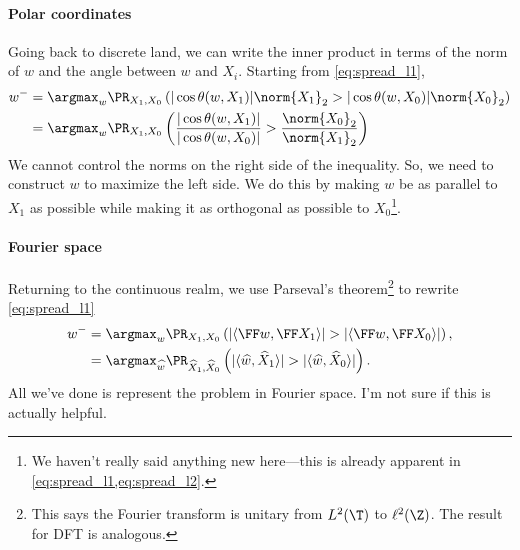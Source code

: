 \documentclass{article}
\begin{document}
\paragraph*{Polar coordinates}
Going back to discrete land, we can write the inner product in terms of the norm of $w$ and the angle between $w$ and $X_i$.
Starting from \cref{eq:spread_l1},
\begin{align}
  w^-
  &= \argmax_{w} \PR_{X_1, X_0} \left( |\cos \theta(w,X_1) | \norm{X_1}_{2} > | \cos \theta(w,X_0) | \norm{X_0}_{2} \right) \\
  &= \argmax_{w} \PR_{X_1, X_0} \left( \frac{ |\cos \theta(w,X_1) | }{ | \cos \theta(w,X_0) | } > \frac{ \norm{X_0}_{2} }{ \norm{X_1}_{2} } \right)
\end{align}
We cannot control the norms on the right side of the inequality.
So, we need to construct $w$ to maximize the left side.
We do this by making $w$ be as parallel to $X_1$ as possible while making it as orthogonal as possible to $X_0$\footnote{We haven't really said anything new here—this is already apparent in \cref{eq:spread_l1,eq:spread_l2}.}.

\paragraph*{Fourier space}
Returning to the continuous realm, we use Parseval's theorem\footnote{This says the Fourier transform is unitary from $L^2(\T)$ to $\ell^2(\Z)$. The result for DFT is analogous.} to rewrite \cref{eq:spread_l1}
\begin{align}
  w^-
  &= \argmax_{w} \PR_{X_1, X_0} \left( |\langle \FF w, \FF X_1 \rangle| > |\langle \FF w, \FF X_0 \rangle| \right), \\
  &= \argmax_{\widehat{w}} \PR_{\widehat{X}_1, \widehat{X}_0} \left( |\langle \widehat{w}, \widehat{X}_1 \rangle| > |\langle \widehat{w}, \widehat{X}_0 \rangle| \right).
\end{align}
All we've done is represent the problem in Fourier space.
I'm not sure if this is actually helpful.

\end{document}
